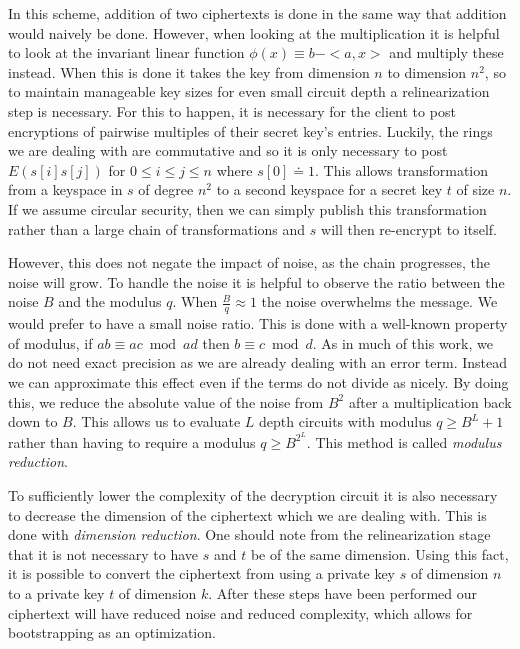 \documentclass[letterpaper,twocolumn,10pt]{article}
\begin{document}
In this scheme, addition of two ciphertexts is done in the same way that addition would naively be done. However, when looking at the multiplication it is helpful to look at the invariant linear function $\phi(x) \equiv b - <a,x>$ and multiply these instead. When this is done it takes the key from dimension $n$ to dimension $n^2$, so to maintain manageable key sizes for even small circuit depth a relinearization step is necessary. For this to happen, it is necessary for the client to post encryptions of pairwise multiples of their secret key's entries. Luckily, the rings we are dealing with are commutative and so it is only necessary to post $E(s[i]s[j])$ for $0 \leq i \leq j \leq n$ where $s[0] \doteq 1$. This allows transformation from a keyspace in $s$ of degree $n^2$ to a second keyspace for a secret key $t$ of size $n$. If we assume circular security, then we can simply publish this transformation rather than a large chain of transformations and $s$ will then re-encrypt to itself.

However, this does not negate the impact of noise, as the chain progresses, the noise will grow. To handle the noise it is helpful to observe the ratio between the noise $B$ and the modulus $q$. When $\frac{B}{q} \approx 1$ the noise overwhelms the message. We would prefer to have a small noise ratio. This is done with a well-known property of modulus, if $ab \equiv ac \bmod ad$ then $b \equiv c \bmod d$. As in much of this work, we do not need exact precision as we are already dealing with an error term. Instead we can approximate this effect even if the terms do not divide as nicely. By doing this, we reduce the absolute value of the noise from $B^2$ after a multiplication back down to $B$. This allows us to evaluate $L$ depth circuits with modulus $q \geq B^L+1$ rather than having to require a modulus $q \geq B^{2^L}$. This method is called \emph{modulus reduction}.

To sufficiently lower the complexity of the decryption circuit it is also necessary to decrease the dimension of the ciphertext which we are dealing with. This is done with \emph{dimension reduction}. One should note from the relinearization stage that it is not necessary to have $s$ and $t$ be of the same dimension. Using this fact, it is possible to convert the ciphertext from using a private key $s$ of dimension $n$ to a private key $t$ of dimension $k$. After these steps have been performed our ciphertext will have reduced noise and reduced complexity, which allows for bootstrapping as an optimization.
\end{document}
